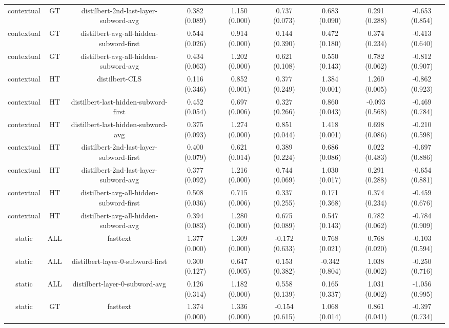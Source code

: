 \begin{sidewaystable}[htb]
\begin{tabular}{@{}ccccccccc@{}}
        contextual & GT & distilbert-2nd-last-layer-subword-avg & 0.382 (0.089) & 1.150 (0.000) & 0.737 (0.073) & 0.683 (0.090) & 0.291 (0.288) & -0.653 (0.854) \\
        contextual & GT & distilbert-avg-all-hidden-subword-first & 0.544 (0.026) & 0.914 (0.000) & 0.144 (0.390) & 0.472 (0.180) & 0.374 (0.234) & -0.413 (0.640) \\
        contextual & GT & distilbert-avg-all-hidden-subword-avg & 0.434 (0.063) & 1.202 (0.000) & 0.621 (0.108) & 0.550 (0.143) & 0.782 (0.062) & -0.812 (0.907) \\
        contextual & HT & distilbert-CLS & 0.116 (0.346) & 0.852 (0.001) & 0.377 (0.249) & 1.384 (0.001) & 1.260 (0.005) & -0.862 (0.923) \\
        contextual & HT & distilbert-last-hidden-subword-first & 0.452 (0.054) & 0.697 (0.006) & 0.327 (0.266) & 0.860 (0.043) & -0.093 (0.568) & -0.469 (0.784) \\
        contextual & HT & distilbert-last-hidden-subword-avg & 0.375 (0.093) & 1.274 (0.000) & 0.851 (0.044) & 1.418 (0.001) & 0.698 (0.086) & -0.210 (0.598) \\
        contextual & HT & distilbert-2nd-last-layer-subword-first & 0.400 (0.079) & 0.621 (0.014) & 0.389 (0.224) & 0.686 (0.086) & 0.022 (0.483) & -0.697 (0.886) \\
        contextual & HT & distilbert-2nd-last-layer-subword-avg & 0.377 (0.092) & 1.216 (0.000) & 0.744 (0.069) & 1.030 (0.017) & 0.291 (0.288) & -0.654 (0.881) \\
        contextual & HT & distilbert-avg-all-hidden-subword-first & 0.508 (0.036) & 0.715 (0.006) & 0.337 (0.255) & 0.171 (0.368) & 0.374 (0.234) & -0.459 (0.676) \\
        contextual & HT & distilbert-avg-all-hidden-subword-avg & 0.394 (0.083) & 1.280 (0.000) & 0.675 (0.089) & 0.547 (0.143) & 0.782 (0.062) & -0.784 (0.909) \\
        static & ALL & fasttext & 1.377 (0.000) & 1.309 (0.000) & -0.172 (0.633) & 0.768 (0.021) & 0.768 (0.020) & -0.103 (0.594) \\
        static & ALL & distilbert-layer-0-subword-first & 0.300 (0.127) & 0.647 (0.005) & 0.153 (0.382) & -0.342 (0.804) & 1.038 (0.002) & -0.250 (0.716) \\
        static & ALL & distilbert-layer-0-subword-avg & 0.126 (0.314) & 1.182 (0.000) & 0.558 (0.139) & 0.165 (0.337) & 1.031 (0.002) & -1.056 (0.995) \\
        static & GT & fasttext & 1.374 (0.000) & 1.336 (0.000) & -0.154 (0.615) & 1.068 (0.014) & 0.861 (0.041) & -0.397 (0.734) \\

\end{tabular}
\end{sidewaystable}
